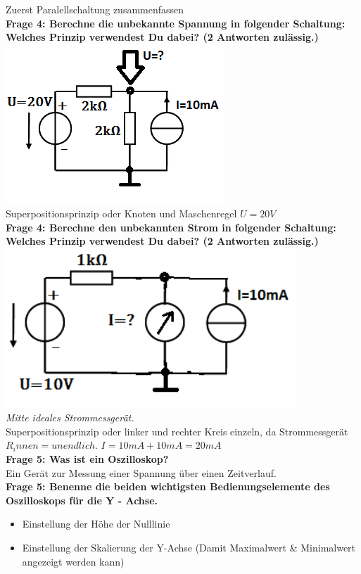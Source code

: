 \documentclass[11pt,a4paper]{scrartcl}
\begin{document}
Zuerst Paralellschaltung zusammenfassen\\
\textbf{Frage 4: Berechne die unbekannte Spannung in folgender Schaltung: Welches Prinzip verwendest Du dabei? (2 Antworten zulässig.)}\\
\includegraphics[height=6cm,keepaspectratio]{Spannung_berechnen.png}\\
Superpositionsprinzip oder Knoten und Maschenregel $U=20V$\\
\textbf{Frage 4: Berechne den unbekannten Strom in folgender Schaltung: Welches Prinzip verwendest Du dabei? (2 Antworten zulässig.)}\\
\includegraphics[height=6cm,keepaspectratio]{Strom_berechnen.png}\\
\textit{Mitte ideales Strommessgerät.}\\
Superpositionsprinzip oder linker und rechter Kreis einzeln, da Strommessgerät $R_innen=unendlich$. $I=10mA+10mA=20mA$\\
\textbf{Frage 5: Was ist ein Oszilloskop?}\\
Ein Gerät zur Messung einer Spannung über einen Zeitverlauf.\\
\textbf{Frage 5: Benenne die beiden wichtigsten Bedienungselemente des Oszilloskops für die Y - Achse.}\\
\begin{itemize}
	\item Einstellung der Höhe der Nulllinie
	\item Einstellung der Skalierung der Y-Achse (Damit Maximalwert \& Minimalwert angezeigt werden kann)
\end{itemize}
\end{document}
